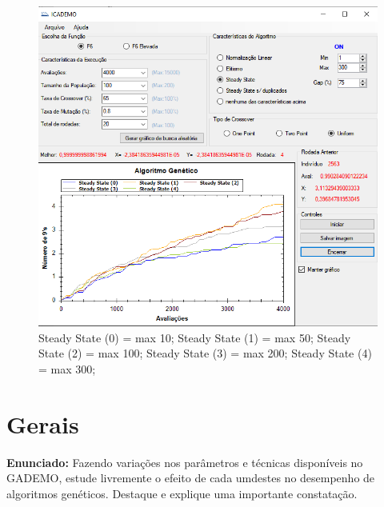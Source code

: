 \documentclass[12pt]{article}
\begin{document}
\begin{figure}[H]
	\centering
	\includegraphics[width=0.7\linewidth]{Imagens/questao7}
	\caption{Steady State (0) = max 10; Steady State (1) = max 50; Steady State (2) = max 100; Steady State (3) = max 200; Steady State (4) = max 300;}
	\label{fig:questao7}
\end{figure}


\section{Gerais}
\textbf{Enunciado:}
Fazendo variações nos parâmetros e técnicas disponíveis no GADEMO, estude livremente o efeito de cada umdestes no desempenho de algoritmos genéticos. Destaque e explique uma importante constatação.

	 
	
\end{document}
